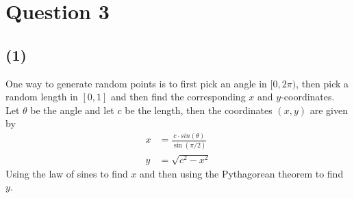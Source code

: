 \documentclass[a4paper]{article}
\begin{document}
\newpage
\section*{Question 3}
\subsection*{(1)}
One way to generate random points is to first pick an angle in $[0, 2\pi)$, then pick a random length in $[0,1]$ and then find the corresponding $x$ and $y$-coordinates. Let $\theta$ be the angle and let $c$ be the length, then the coordinates $(x,y)$ are given by
\begin{align*}
x&=\frac{c\cdot sin(\theta)}{\sin(\pi/2)} \\
y&=\sqrt{c^2-x^2}
\end{align*}
Using the law of sines to find $x$ and then using the Pythagorean theorem to find $y$.

\newpage
\end{document}
